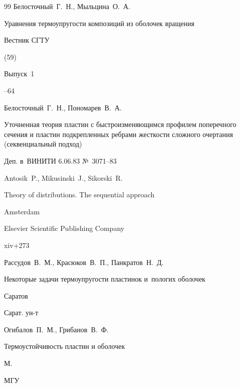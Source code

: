 \begin{thebibliography}{99}
\by Белосточный~Г.~Н., Мыльцина~О.~А.

\paper Уравнения термоупругости композиций из оболочек вращения

\jour Вестник СГТУ


(59)

\issueinfo Выпуск~1

--64




\by Белосточный~Г.~Н., Пономарев~В.~А.

\preprint Уточненная теория пластин с быстроизменяющимся профилем поперечного сечения и пластин подкрепленных ребрами жесткости сложного очертания (секвенциальный подход)

\preprintinfo  Деп. в~ВИНИТИ 6.06.83 №~3071--83






\by Antosik~P.,  Mikusinski~J., Sikorski~R.

\book Theory of distributions. The sequential approach


\publaddr Amsterdam

\publ Elsevier Scientific Publishing Company

\totalpages xiv+273 





\by Рассудов~В.~М., Красюков~В.~П., Панкратов~Н.~Д.

\book Некоторые задачи термоупругости пластинок и~пологих оболочек

\publaddr Саратов

\publ Сарат. ун-т






\by Огибалов~П.~М., Грибанов~В.~Ф.

\book Термоустойчивость пластин и оболочек

\publaddr М.

\publ МГУ


\end{thebibliography}
